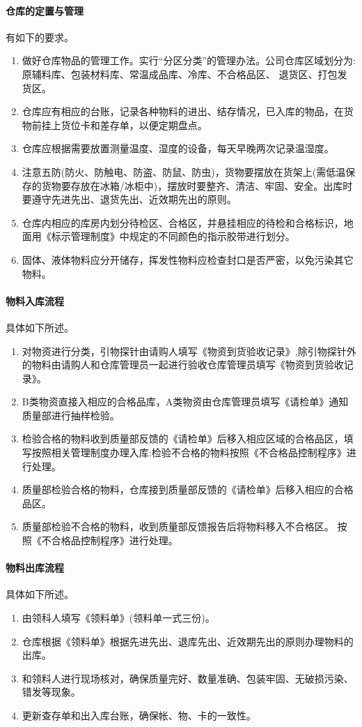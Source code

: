 \paragraph{仓库的定置与管理} 有如下的要求。
\begin{enumerate}
    \item 做好仓库物品的管理工作。实行“分区分类”的管理办法。公司仓库区域划分为:原辅料库、包装材料库、常温成品库、冷库、不合格品区、 退货区、打包发货区。
    \item 仓库应有相应的台账，记录各种物料的进出、结存情况，已入库的物品，在货物前挂上货位卡和差存单，以便定期盘点。
    \item 仓库应根据需要放置测量温度、湿度的设备，每天早晚两次记录温湿度。
    \item 注意五防(防火、防触电、防盗、防鼠、防虫)，货物要摆放在货架上(需低温保存的货物要存放在冰箱/冰柜中)，摆放时要整齐、清洁、牢固、安全。出库时要遵守先进先出、退货先出、近效期先出的原则。
    \item 仓库内相应的库房内划分待检区、合格区，并悬挂相应的待检和合格标识，地面用《标示管理制度》中规定的不同颜色的指示胶带进行划分。
    \item 固体、液体物料应分开储存，挥发性物料应检查封口是否严密，以免污染其它物料。
\end{enumerate}

\paragraph{物料入库流程} 具体如下所述。
\begin{enumerate}
    \item 对物资进行分类，引物探针由请购人填写《物资到货验收记录》,除引物探针外的物料由请购人和仓库管理员一起进行验收仓库管理员填写《物资到货验收记录》。
    \item B类物资直接入相应的合格品库，A类物资由仓库管理员填写《请检单》通知质量部进行抽样检验。
    \item 检验合格的物料收到质量部反馈的《请检单》后移入相应区域的合格品区，填写按照相关管理制度办理入库:检验不合格的物料按照《不合格品控制程序》进行处理。
    \item 质量部检验合格的物料，仓库接到质量部反馈的《请检单》后移入相应的合格品区。
    \item 质量部检验不合格的物料，收到质量部反馈报告后将物料移入不合格区。 按照《不合格品控制程序》进行处理。
\end{enumerate}

\paragraph{物料出库流程} 具体如下所述。
\begin{enumerate}
    \item 由领科人填写《领料单》(领料单一式三份)。
    \item 仓库根据《领料单》根据先进先出、退库先出、近效期先出的原则办理物料的出库。
    \item 和领料人进行现场核对，确保质量完好、数量准确、包装牢固、无破损污染、错发等现象。
    \item 更新查存单和出入库台账，确保帐、物、卡的一致性。
\end{enumerate}
